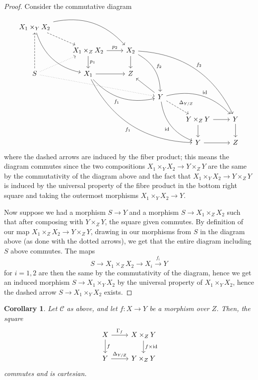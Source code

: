 \documentclass[10pt]{article}
\newtheorem{corollary}[subsubsection]{Corollary}
\theoremstyle{definition}
\theoremstyle{remark}
\numberwithin{equation}{section}
\numberwithin{figure}{subsubsection}
\DeclareMathOperator{\id}{id}
\begin{document}
\begin{proof}[Proof]
  Consider the commutative diagram
  \begin{equation*}
    \begin{tikzcd}
      X_1 \times_Y X_2\arrow[dashed]{dr}\arrow[bend right]{ddr}\arrow[bend
      left]{drr}\\
      & X_1 \times_Z X_2\rar{p_2}\dar{p_1} & X_2\arrow[bend left]{ddr}{f_2}\dar
      \arrow[bend left]{dddrrr}{f_2}\\
      S\arrow[dotted]{drrr}\arrow[dotted]{ur}\arrow[dashed]{uu} & X_1
      \arrow[bend right]{drr}[swap]{f_1} \rar
      \arrow[bend right]{dddrrr}[swap]{f_1} & Z\\
      & & & Y\arrow{ul}\arrow[dashed]{dr}{\Delta_{Y/Z}}
      \arrow[bend left]{drr}{\id}\arrow[bend right]{ddr}[swap]{\id}\\
      & & & & Y \times_Z Y\dar\rar & Y\dar\\
      & & & & Y \rar & Z
    \end{tikzcd}
  \end{equation*}
  where the dashed arrows are induced by the fiber product; this means the
  diagram commutes since the two compositions $X_1 \times_Y X_2 \to Y \times_Z
  Y$ are the same by the commutativity of the diagram above and the fact that
  $X_1 \times_Y X_2 \to Y \times_Z Y$ is induced by the universal property of
  the fibre product in the bottom right square
  and taking the outermost morphisms $X_1 \times_Y X_2 \to Y$.
  \par Now suppose we had a morphism $S \to Y$ and a morphism $S \to X_1
  \times_Z X_2$ such that after composing with $Y \times_ZY$, the square given
  commutes. By definition of our map $X_1 \times_Z X_2 \to Y \times_Z Y$,
  drawing in our morphisms from $S$ in the diagram above (as done with the
  dotted arrows), we get that the entire diagram including $S$ above commutes.
  The maps
  \begin{equation*}
    S \longrightarrow X_1 \times_Z X_2 \longrightarrow X_i
    \overset{f_i}{\longrightarrow} Y
  \end{equation*}
  for $i=1,2$ are then the same by the commutativity of the diagram, hence we
  get an induced morphism $S \to X_1 \times_Y X_2$ by the universal property of
  $X_1 \times_Y X_2$, hence the dashed arrow $S \to X_1 \times_Y X_2$ exists.
\end{proof}
\begin{corollary}\label{lem:magicgraph}
  Let $\mathscr{C}$ as above, and let $f \colon X \to Y$ be a morphism over $Z$.
  Then, the square
  \begin{equation*}
    \begin{tikzcd}
      X \rar{\Gamma_f}\dar{f} & X \times_Z Y\dar{f \times \id}\\
      Y \rar{\Delta_{Y/Z}} & Y \times_Z Y
    \end{tikzcd}
  \end{equation*}
  commutes and is cartesian.
\end{corollary}
\end{document}
